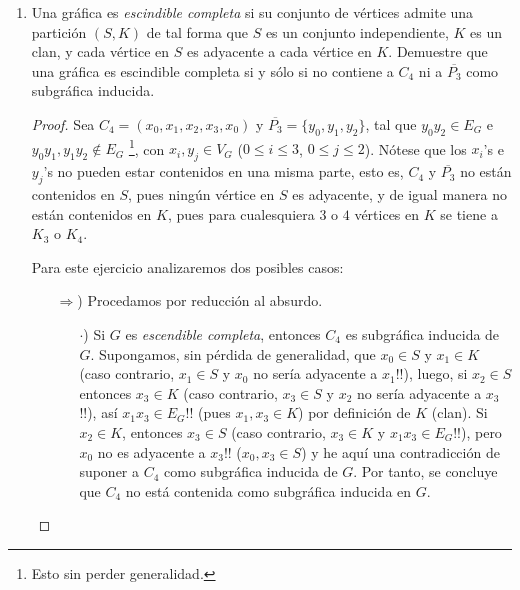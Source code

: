 \documentclass{article}
\begin{document}
\begin{enumerate}
\begin{proof}
\begin{itemize}
      pues de la dicotomia se cumple con $<$. Además sabemos que el número de
      componentes conexas aumenta exactamente en $1$ (porque estamos trabjando
      con gráficas simples) en $G -e$, de lo anterior se sigue que
      \begin{eqnarray}
        c(G -e) = c(G) +1\\
        \Rightarrow c(G -e) \leq c(G) +1
      \end{eqnarray}
      de $7$ y $9$ se sigue
      \[
      c(G) \le c(G-e) \le c(G) + 1
      \]
    \end{itemize}
    De lo anterior concluimos que $c(G) \le c(G-e) \le c(G) + 1$.
  \end{proof}
\item Una gr\'afica es \textit{escindible completa} si su conjunto de
  v\'ertices admite una partici\'on $(S,K)$ de tal forma que $S$ es un
  conjunto independiente, $K$ es un clan, y cada v\'ertice en $S$ es adyacente
  a cada v\'ertice en $K$. Demuestre que una gr\'afica es escindible
  completa si y s\'olo si no contiene a $C_4$ ni a $\overline{P_3}$ como
  subgr\'afica inducida.
  
  \renewcommand\qedsymbol{QED}
  \begin{proof}
    Sea $C_4 = (x_0, x_1, x_2, x_3, x_0)$ y $\overline{P_3} = \{y_0, y_1, y_2\}$,
    tal que $y_0 y_2 \in E_G$ e $y_0 y_1, y_1 y_2 \notin E_G$ \footnote{Esto sin
    perder generalidad.}, con $x_i, y_j \in V_G$ ($0 \leq i \leq 3$, $0 \leq j \leq 2$).
    N\'otese que los $x_i$'s e $y_j$'s no pueden estar contenidos en una misma parte,
    esto es, $C_4$ y $\overline{P_3}$ no est\'an contenidos en $S$, pues ning\'un
    v\'ertice en $S$ es adyacente, y de igual manera no est\'an contenidos en $K$, pues
    para cualesquiera $3$ o $4$ v\'ertices en $K$ se tiene a $K_3$ o $K_4$.
    
    Para este ejercicio analizaremos dos posibles casos:
    \begin{itemize}
    \item[$\Rightarrow$)] Procedamos por reducción al absurdo.
      \begin{itemize}
      \item[$\cdot$)] Si $G$ es \textit{escendible completa}, entonces $C_4$ es
        subgr\'afica inducida de $G$.
        Supongamos, sin p\'erdida de generalidad, que $x_0 \in S$ y $x_1 \in K$
        (caso contrario, $x_1 \in S$ y $x_0$ no ser\'ia adyacente a $x_1$!!),
        luego, si $x_2 \in S$ entonces $x_3 \in K$ (caso contrario, $x_3 \in S$
        y $x_2$ no ser\'ia adyacente a $x_3$!!), as\'i $x_1 x_3 \in E_G$!! (pues
        $x_1, x_3 \in K$) por definici\'on de $K$ (clan). Si $x_2 \in K$, entonces
        $x_3 \in S$ (caso contrario, $x_3 \in K$ y $x_1 x_3 \in E_G$!!), pero $x_0$
        no es adyacente a $x_3$!! ($x_0, x_3 \in S$) y he aqu\'i una contradicci\'on
        de suponer a $C_4$ como subgr\'afica inducida de $G$. Por tanto, se concluye
        que $C_4$ no est\'a contenida como subgr\'afica inducida en $G$.
        

\end{itemize}
\end{itemize}
\end{proof}
\end{enumerate}
\end{document}
